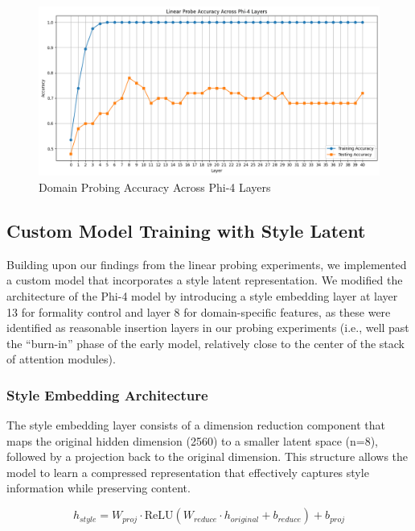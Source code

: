 \documentclass{article}
\begin{document}
\begin{figure}
    \centering
    \includegraphics[width=1.0\textwidth]{figures/3_domain.png}
    \caption{Domain Probing Accuracy Across Phi-4 Layers}
    \label{fig:domain-accuracy}
\end{figure}

\subsection{Custom Model Training with Style Latent}

Building upon our findings from the linear probing experiments, we implemented a custom model that incorporates a style latent representation. We modified the architecture of the Phi-4 model by introducing a style embedding layer at layer 13 for formality control and layer 8 for domain-specific features, as these were identified as reasonable insertion layers in our probing experiments (i.e., well past the ``burn-in'' phase of the early model, relatively close to the center of the stack of attention modules).

\subsubsection{Style Embedding Architecture}
The style embedding layer consists of a dimension reduction component that maps the original hidden dimension (2560) to a smaller latent space (n=8), followed by a projection back to the original dimension. This structure allows the model to learn a compressed representation that effectively captures style information while preserving content.

\begin{equation}
h_{style} = W_{proj} \cdot \text{ReLU}(W_{reduce} \cdot h_{original} + b_{reduce}) + b_{proj}
\end{equation}
\end{document}

